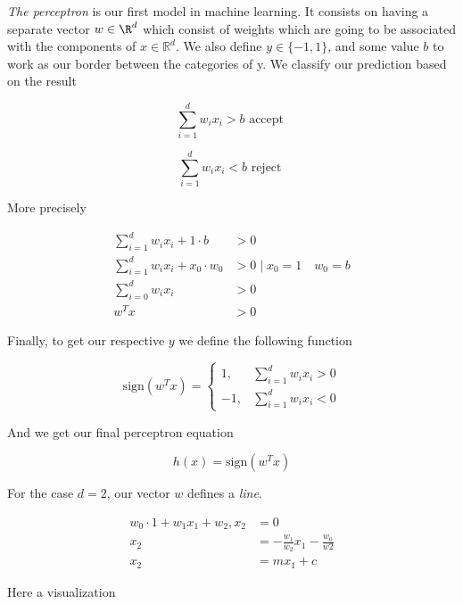 \emph{The perceptron} is our first model in machine learning. It consists on having a separate vector \(w \in \R^d\) which consist of weights which are going to be 
associated with the components of \(x \in \mathbb{R}^d\). We also define \(y \in \{-1,1\}\),  and some value \(b\) to work as our border between the categories of y. 
We classify our prediction based on the result 

\[
    \sum_{i = 1}^{d} w_i x_i > b \text{ accept }
\]

\[
    \sum_{i = 1}^{d} w_i x_i < b \text{ reject }
\]

More precisely 

\begin{align*}
    \sum_{i = 1}^{d} w_i x_i + 1 \cdot b &> 0 \\ 
    \sum_{i = 1}^{d} w_i x_i + x_0 \cdot w_0 &> 0  \mid x_0 = 1 \quad w_0 = b\\
    \sum_{i = 0}^{d} w_i x_i &> 0  \\
    w^T x &> 0 
\end{align*}

Finally, to get our respective \(y\) we define the following function 

\[
    \text{sign}(w^T x) = \begin{cases}
     1, &\sum_{i = 1}^{d} w_i x_i > 0\\
    -1, &\sum_{i = 1}^{d} w_i x_i < 0
    \end{cases}
\]

And we get our final perceptron equation 

\[
    h(x) = \text{sign}(w^Tx)
\]

For the case \(d = 2\),  our vector \(w\) defines a \emph{line}. 

\begin{align*}
    w_0 \cdot 1 + w_1 x_1 + w_2, x_2 &= 0 \\ 
    x_2 &= - \frac{w_1}{w_2} x_1 - \frac{w_0}{w2} \\ 
    x_2 &= m x_1 + c
\end{align*}

Here a visualization 

\begin{center}
\end{center}

